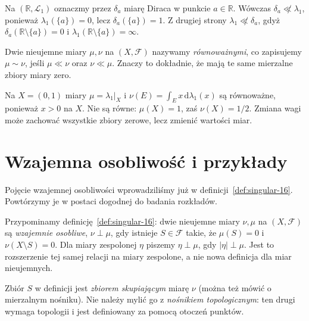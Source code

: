 \begin{przyklad}
Na $(\mathbb R,\mathcal L_1)$ oznaczmy przez $\delta_a$ miarę Diraca
w punkcie $a\in\mathbb R$. Wówczas $\delta_a\not\ll\lambda_1$,
ponieważ $\lambda_1(\{a\})=0$, lecz $\delta_a(\{a\})=1$.
Z drugiej strony $\lambda_1\not\ll\delta_a$, gdyż
$\delta_a(\mathbb R\setminus\{a\})=0$ i
$\lambda_1(\mathbb R\setminus\{a\})=\infty$.
\end{przyklad}

\begin{definicja}
\label{def:equivalent-measures-17}
Dwie nieujemne miary $\mu,\nu$ na $(X,\mathcal F)$ nazywamy
\emph{równoważnymi}, co zapisujemy $\mu\sim\nu$,
jeśli $\mu\ll\nu$ oraz $\nu\ll\mu$.
Znaczy to dokładnie, że mają te same mierzalne zbiory miary zero.
\end{definicja}

\begin{przyklad}
Na $X=(0,1)$ miary $\mu=\lambda_1|_X$ i
$\nu(E)=\int_E x\,\mathrm d\lambda_1(x)$ są równoważne,
ponieważ $x>0$ na $X$. Nie są równe: $\mu(X)=1$,
zaś $\nu(X)=1/2$. Zmiana wagi może zachować wszystkie
zbiory zerowe, lecz zmienić wartości miar.
\end{przyklad}

\section{Wzajemna osobliwość i przykłady}
Pojęcie wzajemnej osobliwości wprowadziliśmy już w
definicji~\ref{def:singular-16}. Powtórzymy je w postaci dogodnej
do badania rozkładów.

Przypominamy definicję~\ref{def:singular-16}:
dwie nieujemne miary $\nu,\mu$ na $(X,\mathcal F)$ są
\emph{wzajemnie osobliwe}, $\nu\perp\mu$, gdy istnieje
$S\in\mathcal F$ takie, że $\mu(S)=0$ i
$\nu(X\setminus S)=0$. Dla miary zespolonej $\eta$
piszemy $\eta\perp\mu$, gdy $|\eta|\perp\mu$.
Jest to rozszerzenie tej samej relacji na miary zespolone,
a nie nowa definicja dla miar nieujemnych.

Zbiór $S$ w definicji jest \emph{zbiorem skupiającym}
miarę $\nu$ (można też mówić o mierzalnym nośniku). Nie należy mylić go z
\emph{nośnikiem topologicznym}: ten drugi wymaga topologii
i jest definiowany za pomocą otoczeń punktów.

